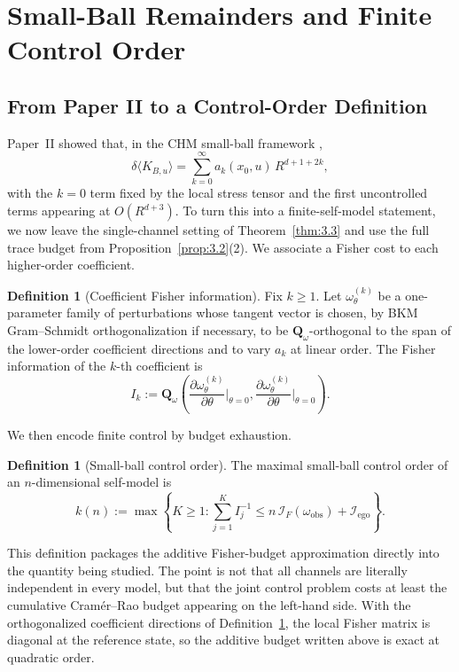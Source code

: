 \documentclass[12pt]{article}
\theoremstyle{definition}
\newtheorem{definition}[theorem]{Definition}
\theoremstyle{remark}
\begin{document}
\section{Small-Ball Remainders and Finite Control Order}\label{sec:4}

\subsection{From Paper II to a Control-Order Definition}\label{subsec:4.1}

Paper~II\cite{PaperII} showed that, in the CHM small-ball framework
\cite{CasiniHuertaMyers2011},
\[
\delta\langle K_{B,u}\rangle
=
\sum_{k=0}^{\infty} a_k(x_0,u)\,R^{d+1+2k},
\]
with the \(k=0\) term fixed by the local stress tensor and the first
uncontrolled terms appearing at \(O(R^{d+3})\). To turn this into a
finite-self-model statement, we now leave the single-channel setting of
Theorem~\ref{thm:3.3} and use the full trace budget from
Proposition~\ref{prop:3.2}(2). We associate a Fisher cost to each
higher-order coefficient.

\begin{definition}[Coefficient Fisher information]\label{def:4.1}
Fix \(k\ge 1\). Let \(\omega_\theta^{(k)}\) be a one-parameter family of
perturbations whose tangent vector is chosen, by BKM Gram--Schmidt
orthogonalization if necessary, to be
\(\mathbf{Q}_\omega\)-orthogonal to the span of the lower-order
coefficient directions and to vary \(a_k\) at linear order. The Fisher
information of the \(k\)-th coefficient is
\[
I_k
:=
\mathbf{Q}_\omega\!\left(
\frac{\partial\omega_\theta^{(k)}}{\partial\theta}\Big|_{\theta=0},
\frac{\partial\omega_\theta^{(k)}}{\partial\theta}\Big|_{\theta=0}
\right).
\]
\end{definition}

We then encode finite control by budget exhaustion.

\begin{definition}[Small-ball control order]\label{def:4.2}
The maximal small-ball control order of an \(n\)-dimensional self-model
is
\[
k(n)
:=
\max\left\{
K\ge 1:
\sum_{j=1}^{K} I_j^{-1}
\le
n\,\mathcal{I}_F(\omega_{\mathrm{obs}})
+
\mathcal{I}_{\mathrm{ego}}
\right\}.
\]
\end{definition}

This definition packages the additive Fisher-budget approximation
directly into the quantity being studied. The point is not that all
channels are literally independent in every model, but that the joint
control problem costs at least the cumulative Cram\'er--Rao budget
appearing on the left-hand side. With the orthogonalized coefficient
directions of Definition~\ref{def:4.1}, the local Fisher matrix is
diagonal at the reference state, so the additive budget written above is
exact at quadratic order.
\end{document}
